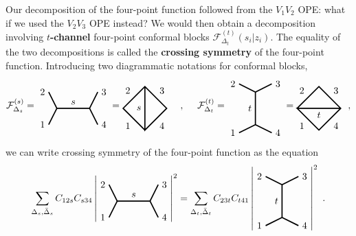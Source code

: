 \documentclass[12pt, a4paper, notitlepage, twoside]{report}
\numberwithin{equation}{section}
\theoremstyle{break}
\begin{document}
Our decomposition of the four-point function followed from the $V_1V_2$ OPE: what if we used the $V_2V_3$ OPE instead? We would then obtain a decomposition involving \textbf{\boldmath $t$-channel} four-point conformal blocks  $\mathcal{F}^{(t)}_{\Delta_t}(s_i|z_i)$.
The equality of the two decompositions is called the \textbf{\boldmath crossing symmetry} of the four-point function.
Introducing two diagrammatic notations for conformal blocks, 
\begin{align}
 \mathcal{F}^{(s)}_{\Delta_s}  =  
\begin{tikzpicture}[baseline=(current  bounding  box.center), very thick, scale = .3]
\draw (-1,2) node [left] {$2$} -- (0,0) -- node [above] {$s$} (4,0) -- (5,2) node [right] {$3$};
\draw (-1,-2) node [left] {$1$} -- (0,0);
\draw (4,0) -- (5,-2) node [right] {$4$};
\end{tikzpicture}
=
\begin{tikzpicture}[baseline=(current  bounding  box.center), very thick, scale = .4]
\draw (0, -2) -- node [below left] {$1$} (-2, 0) -- node [above left] {$2$} (0, 2) -- node [above right] {$3$} (2, 0) -- node [below right] {$4$} (0, -2) -- node [left] {$s$} (0, 2); 
\end{tikzpicture}
\quad\ ,\quad\
 \mathcal{F}^{(t)}_{\Delta_t}  =  
\begin{tikzpicture}[baseline=(current  bounding  box.center), very thick, scale = .3]
 \draw (-2,3) node [left] {$2$} -- (0,2) -- node [left] {$t$} (0,-2) -- (-2, -3) node [left] {$1$};
\draw (0,2) -- (2,3) node [right] {$3$};
\draw (0,-2) -- (2, -3) node [right] {$4$};
\end{tikzpicture}
=
\begin{tikzpicture}[baseline=(current  bounding  box.center), very thick, scale = .4]
\draw (-2, 0) -- node [above left] {$2$} (0, 2) -- node [above right] {$3$} (2, 0) -- node [below right] {$4$} (0, -2) -- node [below left] {$1$} (-2, 0) -- node [below] {$t$} (2, 0); 
\end{tikzpicture}
\ \ ,
\end{align}
we can write crossing symmetry of the four-point function as the equation
\begin{align}
 \sum_{\Delta_s,\bar{\Delta}_s} C_{12s} C_{s34} \left| 
 \begin{tikzpicture}[baseline=(current  bounding  box.center), very thick, scale = .3]
\draw (-1,2) node [left] {$2$} -- (0,0) -- node [above] {$s$} (4,0) -- (5,2) node [right] {$3$};
\draw (-1,-2) node [left] {$1$} -- (0,0);
\draw (4,0) -- (5,-2) node [right] {$4$};
\end{tikzpicture} 
\right|^2 = \sum_{\Delta_t,\bar{\Delta}_t} C_{23t}C_{t41} \left|
\begin{tikzpicture}[baseline=(current  bounding  box.center), very thick, scale = .3]
 \draw (-2,3) node [left] {$2$} -- (0,2) -- node [left] {$t$} (0,-2) -- (-2, -3) node [left] {$1$};
\draw (0,2) -- (2,3) node [right] {$3$};
\draw (0,-2) -- (2, -3) node [right] {$4$};
\end{tikzpicture}
\right|^2\ .
\label{csd}
\end{align}
\end{document}
